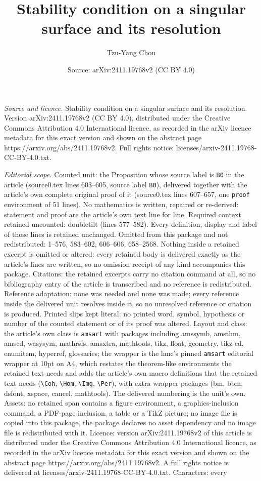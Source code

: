 \documentclass[10pt,a4paper]{amsart}
\title[Stability condition on a singular surface and its resolution]{Stability condition on a singular surface and its resolution}
\author{Tzu-Yang Chou}
\date{Source: arXiv:2411.19768v2 (CC BY 4.0)}
\begin{document}
\maketitle

\noindent\emph{Source and licence.} Stability condition on a singular surface and its resolution. Version arXiv:2411.19768v2 (CC BY 4.0), distributed under the Creative Commons Attribution 4.0 International licence, as recorded in the arXiv licence metadata for this exact version and shown on the abstract page https://arxiv.org/abs/2411.19768v2. Full rights notice: licenses/arxiv-2411.19768-CC-BY-4.0.txt.\par\smallskip

\noindent\textit{Editorial scope.} Counted unit: the Proposition whose source label is \texttt{B0} in the article (source0.tex lines 603--605, source label \texttt{B0}), delivered together with the article's own complete original proof of it (source0.tex lines 607--657, one \texttt{proof} environment of 51 lines). No mathematics is written, repaired or re-derived: statement and proof are the article's own text line for line. Required context retained uncounted: doubletilt (lines 577--582). Every definition, display and label of those lines is retained unchanged. Omitted from this package and not redistributed: 1--576, 583--602, 606--606, 658--2568. Nothing inside a retained excerpt is omitted or altered: every retained body is delivered exactly as the article's lines are written, so no omission receipt of any kind accompanies this package. Citations: the retained excerpts carry no citation command at all, so no bibliography entry of the article is transcribed and no reference is redistributed. Reference adaptation: none was needed and none was made; every reference inside the delivered unit resolves inside it, so no unresolved reference or citation is produced. Printed slips kept literal: no printed word, symbol, hypothesis or number of the counted statement or of its proof was altered. Layout and class: the article's own class is \texttt{amsart} with packages including amssymb, amsthm, amscd, wasysym, mathrsfs, amsxtra, mathtools, tikz, float, geometry, tikz-cd, enumitem, hyperref, glossaries; the wrapper is the lane's pinned \texttt{amsart} editorial wrapper at 10pt on A4, which restates the theorem-like environments the retained text needs and adds the article's own macro definitions that the retained text needs (\texttt{\textbackslash Coh}, \texttt{\textbackslash Hom}, \texttt{\textbackslash Img}, \texttt{\textbackslash Per}), with extra wrapper packages (bm, bbm, dsfont, xspace, cancel, mathtools). The delivered numbering is the unit's own. Assets: no retained span contains a figure environment, a graphics-inclusion command, a PDF-page inclusion, a table or a TikZ picture; no image file is copied into this package, the package declares no asset dependency and no image file is redistributed with it. Licence: version arXiv:2411.19768v2 of this article is distributed under the Creative Commons Attribution 4.0 International licence, as recorded in the arXiv licence metadata for this exact version and shown on the abstract page https://arxiv.org/abs/2411.19768v2. A full rights notice is delivered at licenses/arxiv-2411.19768-CC-BY-4.0.txt. Characters: every 
\end{document}
